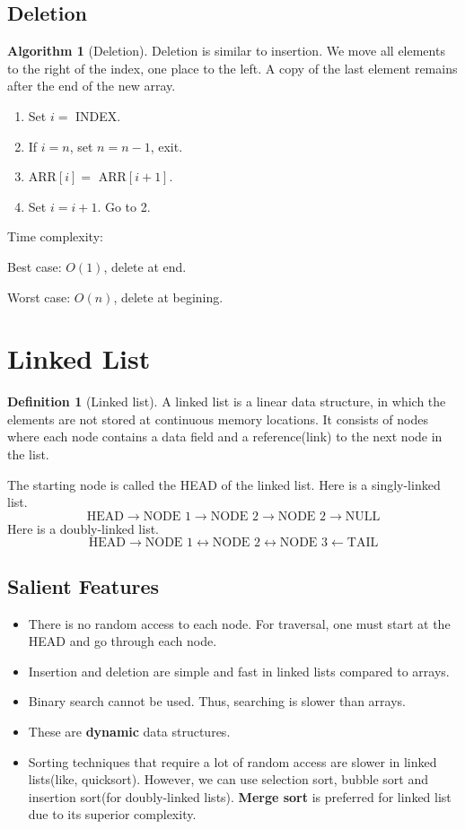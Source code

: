 \documentclass[10pt, a4paper]{extarticle}
\theoremstyle{definition}
\newtheorem{alg}{Algorithm}
\newtheorem{defn}{Definition}
\begin{document}
	\subsection{Deletion}
	\begin{alg}[Deletion]
		Deletion is similar to insertion. We move all elements to the right of the index, one place to the left. A copy of the last element remains after the end of the new array.
		\begin{enumerate}
			\item Set $i=$ INDEX.
			\item If $i=n$, set $n=n-1$, exit.
			\item ARR$[i]=$ ARR$[i+1]$.
			\item Set $i=i+1$. Go to 2.
	\end{enumerate}
	Time complexity:

	Best case: $O(1)$, delete at end.

	Worst case: $O(n)$, delete at begining.
	\end{alg}

	\section{Linked List}
	\begin{defn}[Linked list]
		A linked list is a linear data structure, in which the elements are not stored at continuous memory locations. It consists of nodes where each node contains a data field and a reference(link) to the next node in the list.

		The starting node is called the HEAD of the linked list. Here is a singly-linked list.
		\[\boxed{\text{HEAD}}\to \boxed{\text{NODE 1}}\to \boxed{\text{NODE 2}}\to \boxed{\text{NODE 2}}\to \boxed{\text{NULL}}\]
		Here is a doubly-linked list.
		\[\boxed{\text{HEAD}}\to\boxed{\text{NODE 1}}\leftrightarrow\boxed{\text{NODE 2}}\leftrightarrow\boxed{\text{NODE 3}}\leftarrow\boxed{\text{TAIL}}\]
	\end{defn}
	\subsection{Salient Features}
	\begin{itemize}
		\item There is no random access to each node. For traversal, one must start at the HEAD and go through each node.
		\item Insertion and deletion are simple and fast in linked lists compared to arrays.
		\item Binary search cannot be used. Thus, searching is slower than arrays.
		\item These are \textbf{dynamic} data structures.
		\item Sorting techniques that require a lot of random access are slower in linked lists(like, quicksort). However, we can use selection sort, bubble sort and insertion sort(for doubly-linked lists). \textbf{Merge sort} is preferred for linked list due to its superior complexity.
	\end{itemize}
\end{document}
